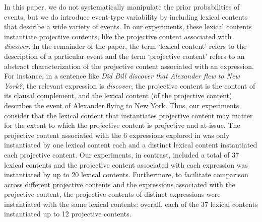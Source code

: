 \documentclass[11pt,fleqn]{article}
\newcommand{\6}{\mbox{$[\hspace*{-.6mm}[$}}
\newcommand{\9}{\mbox{$]\hspace*{-.6mm}]$}}
\begin{document}
In this paper, we do not systematically manipulate the prior probabilities of events, but we do introduce event-type variability by including lexical contents that describe a wide variety of events. In our experiments, these lexical contents instantiate projective contents, like the projective content associated with {\em discover}. In the remainder of the paper, the term `lexical content' refers to the description of a particular event and the term `projective content' refers to an abstract characterization of the projective content associated with an expression. For instance, in  a sentence like {\em Did Bill discover that Alexander flew to New York?}, the relevant expression is {\em discover}, the projective content is the content of its clausal complement, and the lexical content (of the projective content) describes the event of Alexander flying to New York.  Thus, our experiments consider that the lexical content that instantiates projective content may matter for the extent to which the projective content is projective and at-issue. The projective content associated with the 6 expressions explored in \citealt{smith-hall11} was only instantiated by one lexical content each and a distinct lexical content instantiated each projective content. Our experiments, in contrast, included a total of 37 lexical contents and the projective content associated with each expression was instantiated by up to 20 lexical contents. Furthermore, to facilitate comparison across different projective contents and the expressions associated with the projective content, the projective contents of distinct expressions were instantiated with the same lexical contents: overall, each of the 37 lexical contents instantiated up to 12 projective contents.
\end{document}

